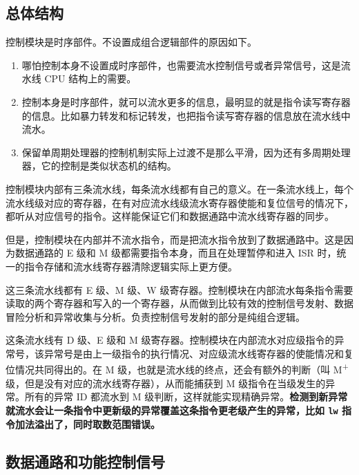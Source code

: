 \documentclass[12pt,AutoFakeBold,AutoFakeSlant]{article}
\providecommand{\tightlist}{%
  \setlength{\itemsep}{0pt}\setlength{\parskip}{0pt}}
\begin{document}
\hypertarget{ux603bux4f53ux7ed3ux6784}{%
\subsection{总体结构}\label{ux603bux4f53ux7ed3ux6784}}

控制模块是时序部件。不设置成组合逻辑部件的原因如下。

\begin{enumerate}
\def\labelenumi{\arabic{enumi}.}
\tightlist
\item
  哪怕控制本身不设置成时序部件，也需要流水控制信号或者异常信号，这是流水线 CPU 结构上的需要。
\item
  控制本身是时序部件，就可以流水更多的信息，最明显的就是指令读写寄存器的信息。比如暴力转发和标记转发，也把指令读写寄存器的信息放在流水线中流水。
\item
  保留单周期处理器的控制机制实际上过渡不是那么平滑，因为还有多周期处理器，它的控制是类似状态机的结构。
\end{enumerate}

控制模块内部有三条流水线，每条流水线都有自己的意义。在一条流水线上，每个流水线级对应的寄存器，在有对应流水线级流水寄存器使能和复位信号的情况下，都听从对应信号的指令。这样能保证它们和数据通路中流水线寄存器的同步。

但是，控制模块在内部并不流水指令，而是把流水指令放到了数据通路中。这是因为数据通路的 E 级和 M 级都需要指令本身，而且在处理暂停和进入 ISR 时，统一的指令存储和流水线寄存器清除逻辑实际上更方便。

\begin{description}
\tightlist
\item[记录寄存器读取和写入情况的三条流水线]
这三条流水线都有 E 级、M 级、W 级寄存器。控制模块在内部流水每条指令需要读取的两个寄存器和写入的一个寄存器，从而做到比较有效的控制信号发射、数据冒险分析和异常收集与分析。负责控制信号发射的部分是纯组合逻辑。
\item[异常 ID 流水线]
这条流水线有 D 级、E 级和 M 级寄存器。控制模块在内部流水对应级指令的异常号，该异常号是由上一级指令的执行情况、对应级流水线寄存器的使能情况和复位情况共同得出的。在 M 级，也就是流水线的终点，还会有额外的判断（叫 M\textsuperscript{+} 级，但是没有对应的流水线寄存器），从而能捕获到 M 级指令在当级发生的异常。所有的异常 ID 都流水到 M 级判断，这样就能实现精确异常。\textbf{检测到新异常就流水会让一条指令中更新级的异常覆盖这条指令更老级产生的异常，比如 \texttt{lw} 指令加法溢出了，同时取数范围错误。}
\end{description}

\hypertarget{ux6570ux636eux901aux8defux548cux529fux80fdux63a7ux5236ux4fe1ux53f7}{%
\subsection{数据通路和功能控制信号}\label{ux6570ux636eux901aux8defux548cux529fux80fdux63a7ux5236ux4fe1ux53f7}}
\end{document}
